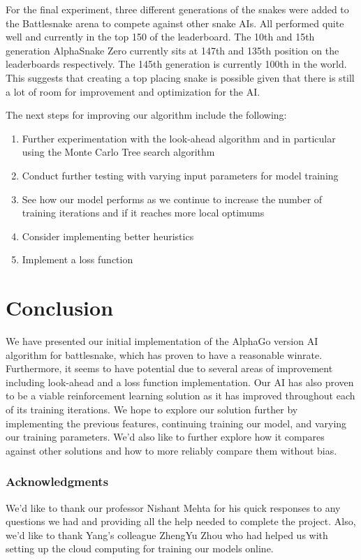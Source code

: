 ﻿\documentclass{article}
\begin{document}
For the final experiment, three different generations of the snakes were added
to the Battlesnake arena to compete against other snake AIs. All performed quite
well and currently in the top 150 of the leaderboard. The 10th and 15th
generation AlphaSnake Zero currently sits at 147th and 135th position on the
leaderboards respectively. The 145th generation is currently 100th in the world.
This suggests that creating a top placing snake is possible given that there is
still a lot of room for improvement and optimization for the AI.

The next steps for improving our algorithm include the following:

\begin{enumerate}
  \item Further experimentation with the look-ahead algorithm and in particular
        using the Monte Carlo Tree search algorithm
  \item Conduct further testing with varying input parameters for model training
  \item See how our model performs as we continue to increase the number of
        training iterations and if it reaches more local optimums
  \item Consider implementing better heuristics
  \item Implement a loss function
\end{enumerate}

\section{Conclusion}

We have presented our initial implementation of the AlphaGo version AI algorithm
for battlesnake, which has proven to have a reasonable winrate. Furthermore, it
seems to have potential due to several areas of improvement including look-ahead
and a loss function implementation. Our AI has also proven to be a viable
reinforcement learning solution as it has improved throughout each of its
training iterations. We hope to explore our solution further by implementing the
previous features, continuing training our model, and varying our training
parameters. We'd also like to further explore how it compares against other
solutions and how to more reliably compare them without bias.

\subsubsection*{Acknowledgments}

We'd like to thank our professor Nishant Mehta for his quick responses to any
questions we had and providing all the help needed to complete the project.
Also, we'd like to thank Yang's colleague ZhengYu Zhou who had helped us with
setting up the cloud computing for training our models online.

\newpage

\small


% 


\end{document}
